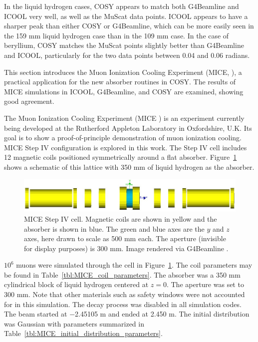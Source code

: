 In the liquid hydrogen cases, COSY appears to match both G4Beamline and ICOOL very well, as well as the MuScat data points. ICOOL appears to have a sharper peak than either COSY or G4Beamline, which can be more easily seen in the 159 mm liquid hydrogen case than in the 109 mm case. In the case of beryllium, COSY matches the MuScat points slightly better than G4Beamline and ICOOL, particularly for the two data points between 0.04 and 0.06 radians.

\label{sec:mice}

This section introduces the Muon Ionization Cooling Experiment (MICE, \cite{mice}), a practical application for the new absorber routines in COSY. The results of MICE simulations in ICOOL, G4Beamline, and COSY are examined, showing good agreement.

\label{ssc:miceIntro}
The Muon Ionization Cooling Experiment (MICE \cite{mice}) is an experiment currently being developed at the Rutherford Appleton Laboratory in Oxfordshire, U.K. Its goal is to show a proof-of-principle demonstration of muon ionization cooling. MICE Step IV configuration is explored in this work. The Step IV cell includes 12 magnetic coils positioned symmetrically around a flat absorber. Figure~\ref{fig:miceStepIV} shows a schematic of this lattice with 350 mm of liquid hydrogen as the absorber.
\begin{figure}[h!]
  \centering
    \includegraphics[width=\textwidth]{Figures/miceStepIV} 
  \caption[MICE Step IV cell.]{MICE Step IV cell. Magnetic coils are shown in yellow and the absorber is shown in blue. The green and blue axes are the $y$ and $z$ axes, here drawn to scale as 500 mm each. The aperture (invisible for display purposes) is 300 mm. Image rendered via G4Beamline \cite{g4bl}.}
  \label{fig:miceStepIV}
\end{figure}

\label{ssc:miceResults}
$10^6$ muons were simulated through the cell in Figure~\ref{fig:miceStepIV}. The coil parameters may be found in Table~\ref{tbl:MICE_coil_parameters}. The absorber was a 350 mm cylindrical block of liquid hydrogen centered at $z=0$. The aperture was set to 300 mm. Note that other materials such as safety windows were not accounted for in this simulation. The decay process was disabled in all simulation codes. The beam started at $-$2.45105 m and ended at 2.450 m. The initial distribution was Gaussian with parameters summarized in Table~\ref{tbl:MICE_initial_distribution_parameters}.

